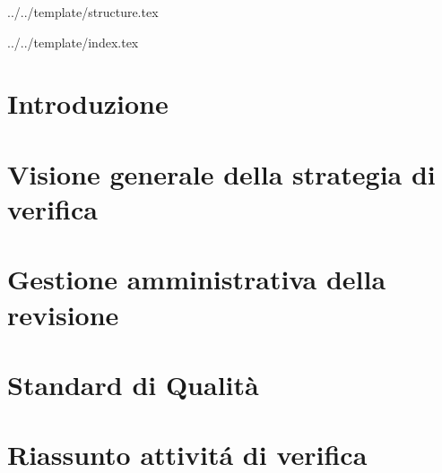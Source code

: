 


\def\DOCUMENTO{Piano di Qualifica}
\def\VERSIONE{1.0.0}

\def\REDATTORE {Bogdan Suierica \\ & Crespan Emanuele}
\def\VERIFICATORE {Burlin Valerio}
\def\RESPONSABILE {Agostinetto Matteo}

\def\USO {Esterno}

\def\DISTRIBUZIONE {\GRUPPO{}\\ & \COMMITTENTE{}\\ & \PROPONENTE{}\\}

\def\DESCRIZIONE {Documento riguardante le strategie di verifica e validazione adottate dal gruppo \GRUPPO\ necessarie ad assicurare i requisiti qualitativi nello svolgimento del progetto \PROGETTO.}


\def\INDICE	{true}
\def\TABELLE {false}
\def\FIGURE {true}


 {../../template/structure.tex}



 {../../template/index.tex}



%

\section{Introduzione}


\newpage
\section{Visione generale della strategia di verifica}


\newpage
\section{Gestione amministrativa della revisione}


\appendix
\newpage
\section{Standard di Qualità}


\newpage
\section{Riassunto attivit\'a di verifica}





